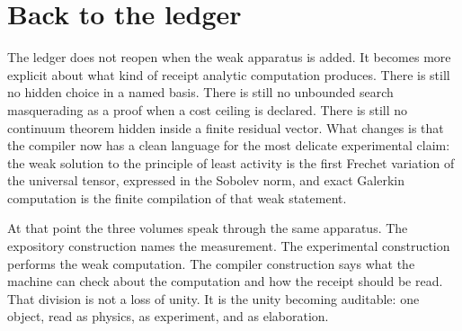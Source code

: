 \section{Back to the ledger}
\label{se:back-to-ledger}

The ledger does not reopen when the weak apparatus is added. It becomes more explicit about what kind of
receipt analytic computation produces. There is still no hidden choice in a named basis. There is still no
unbounded search masquerading as a proof when a cost ceiling is declared. There is still no continuum
theorem hidden inside a finite residual vector. What changes is that the compiler now has a clean language
for the most delicate experimental claim: the weak solution to the principle of least activity is the first
Frechet variation of the universal tensor, expressed in the Sobolev norm, and exact Galerkin computation is
the finite compilation of that weak statement.

At that point the three volumes speak through the same apparatus. The expository construction names the
measurement. The experimental construction performs the weak computation. The compiler construction says
what the machine can check about the computation and how the receipt should be read. That division is not a
loss of unity. It is the unity becoming auditable: one object, read as physics, as experiment, and as
elaboration.
